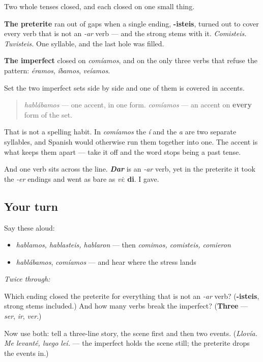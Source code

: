 \begin{grammarlens}[title={What you've built}]
Two whole tenses closed, and each closed on one small thing.

\textbf{The preterite} ran out of gaps when a single ending, \textbf{-isteis}, turned out to cover every verb that is not an \emph{-ar} verb — and the strong stems with it. \emph{Comisteis. Tuvisteis.} One syllable, and the last hole was filled.

\textbf{The imperfect} closed on \emph{comíamos}, and on the only three verbs that refuse the pattern: \emph{éramos}, \emph{íbamos}, \emph{veíamos}.
\end{grammarlens}

\begin{culture}
Set the two imperfect sets side by side and one of them is covered in accents.

\begin{quote}
\emph{hablábamos} — one accent, in one form. \emph{comíamos} — an accent on \textbf{every} form of the set.
\end{quote}

That is not a spelling habit. In \emph{comíamos} the \emph{í} and the \emph{a} are two separate syllables, and Spanish would otherwise run them together into one. The accent is what keeps them apart — take it off and the word stops being a past tense.

And one verb sits across the line. \emph{\textbf{Dar}} is an \emph{-ar} verb, yet in the preterite it took the \emph{-er} endings and went as bare as \emph{vi}: \textbf{di}. I gave.
\end{culture}

\subsection*{Your turn}
Say these aloud:

\begin{itemize}
\raggedright
  \item \emph{hablamos, hablasteis, hablaron} — then \emph{comimos, comisteis, comieron}
  \item \emph{hablábamos}, \emph{comíamos} — and hear where the stress lands
\end{itemize}

\emph{Twice through:}

\begin{tcolorbox}[breakable,colback=teal!4,colframe=teal!35!black,title={Before you move on}]
Which ending closed the preterite for everything that is not an \emph{-ar} verb? (\textbf{-isteis}, strong stems included.) And how many verbs break the imperfect? (\textbf{Three} — \emph{ser}, \emph{ir}, \emph{ver}.)

Now use both: tell a three-line story, the scene first and then two events. (\emph{Llovía. Me levanté, luego leí.} — the imperfect holds the scene still; the preterite drops the events in.)
\end{tcolorbox}
